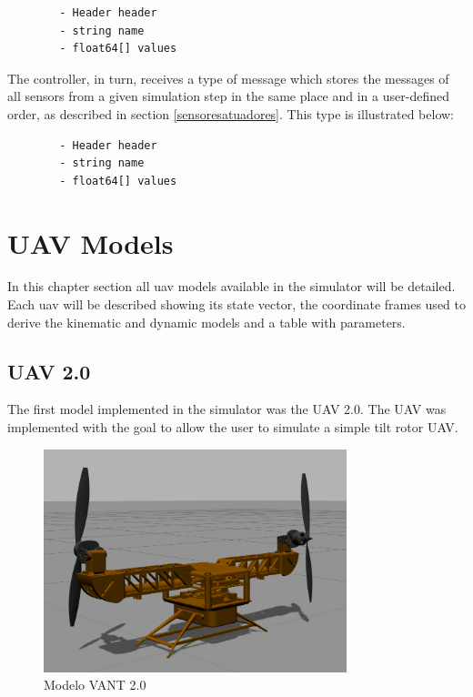 \begin{code}[H]
	\begin{verbatim}
		- Header header
		- string name
		- float64[] values
	\end{verbatim}	
\end{code}

The controller, in turn, receives a type of message which stores the messages of all sensors from a given simulation step in the same place and in a user-defined order, as described in section \ref{sensoresatuadores}. This type is illustrated below:

\begin{code}[H]
	\begin{verbatim}
		- Header header
		- string name
		- float64[] values
	\end{verbatim}
\end{code}
\section{UAV Models}

In this chapter section all uav models available in the simulator will be detailed. Each uav will be described showing its state vector, the coordinate frames used to derive the kinematic and dynamic models and a table with parameters.

\subsection{UAV 2.0}

The first model implemented in the simulator was the UAV 2.0. The UAV was implemented with the goal to allow the user to simulate a simple tilt rotor UAV.

\begin{figure}[!ht]
	\centering
	\includegraphics[width=250pt]{figuras/vant2.png}
	\caption{Modelo VANT 2.0 }
	\label{vant2}
\end{figure}

